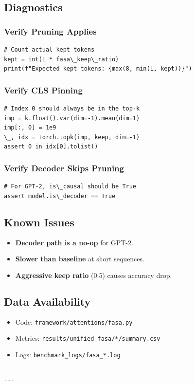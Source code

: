\subsection{Diagnostics}

\subsubsection{Verify Pruning Applies}

\begin{lstlisting}
# Count actual kept tokens
kept = int(L * fasa\_keep\_ratio)
print(f"Expected kept tokens: {max(8, min(L, kept))}")
\end{lstlisting}

\subsubsection{Verify CLS Pinning}

\begin{lstlisting}
# Index 0 should always be in the top-k
imp = k.float().var(dim=-1).mean(dim=1)
imp[:, 0] = 1e9
\_, idx = torch.topk(imp, keep, dim=-1)
assert 0 in idx[0].tolist()
\end{lstlisting}

\subsubsection{Verify Decoder Skips Pruning}

\begin{lstlisting}
# For GPT-2, is\_causal should be True
assert model.is\_decoder == True
\end{lstlisting}

\subsection{Known Issues}

\begin{itemize}
\item \textbf{Decoder path is a no-op} for GPT-2.
\item \textbf{Slower than baseline} at short sequences.
\item \textbf{Aggressive keep ratio} (0.5) causes accuracy drop.

\end{itemize}
\subsection{Data Availability}

\begin{itemize}
\item Code: \texttt{framework/attentions/fasa.py}
\item Metrics: \texttt{results/unified\_fasa/*/summary.csv}
\item Logs: \texttt{benchmark\_logs/fasa\_*.log}
\end{itemize}
\begin{lstlisting}

---
\end{lstlisting}
